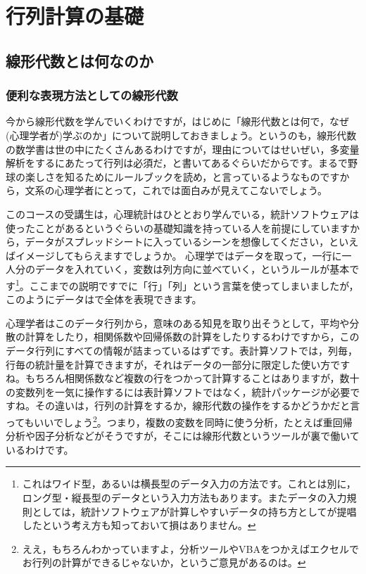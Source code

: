 \documentclass{ltjsbook}
\begin{document}
\chapter{行列計算の基礎}
\label{L01_LinearAlgebra}
\section{線形代数とは何なのか}
\subsection{便利な表現方法としての線形代数}
今から線形代数を学んでいくわけですが，はじめに「線形代数とは何で，なぜ(心理学者が)学ぶのか」について説明しておきましょう。というのも，線形代数の数学書は世の中にたくさんあるわけですが，理由についてはせいぜい，多変量解析をするにあたって行列は必須だ，と書いてあるぐらいだからです。まるで野球の楽しさを知るためにルールブックを読め，と言っているようなものですから，文系の心理学者にとって，これでは面白みが見えてこないでしょう。

このコースの受講生は，心理統計はひととおり学んでいる，統計ソフトウェアは使ったことがあるというぐらいの基礎知識を持っている人を前提にしていますから，データがスプレッドシートに入っているシーンを想像してください，といえばイメージしてもらえますでしょうか。
心理学ではデータを取って，一行に一人分のデータを入れていく，変数は列方向に並べていく，というルールが基本です\footnote{これはワイド型，あるいは横長型のデータ入力の方法です。これとは別に，ロング型・縦長型のデータという入力方法もあります。またデータの入力規則としては，統計ソフトウェアが計算しやすいデータの持ち方として\textcite{Hadley2014}が提唱したという考え方も知っておいて損はありません。}。ここまでの説明ですでに「行」「列」という言葉を使ってしまいましたが，このようにデータはで全体を表現できます。

心理学者はこのデータ行列から，意味のある知見を取り出そうとして，平均や分散の計算をしたり，相関係数や回帰係数の計算をしたりするわけですから，このデータ行列にすべての情報が詰まっているはずです。表計算ソフトでは，列毎，行毎の統計量を計算できますが，それはデータの一部分に限定した使い方ですね。もちろん相関係数など複数の行をつかって計算することはありますが，数十の変数列を一気に操作するには表計算ソフトではなく，統計パッケージが必要ですね。その違いは，行列の計算をするか，線形代数の操作をするかどうかだと言ってもいいでしょう\footnote{ええ，もちろんわかっていますよ，分析ツールやVBAをつかえばエクセルでお行列の計算ができるじゃないか，というご意見があるのは。}。つまり，複数の変数を同時に使う分析，たとえば重回帰分析や因子分析などがそうですが，そこには線形代数というツールが裏で働いているわけです。
\end{document}
